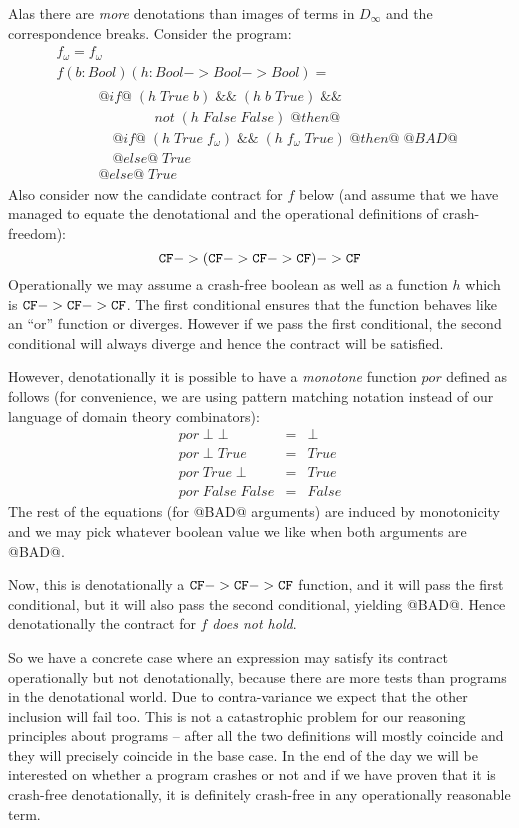 Alas there are {\em more} denotations than images of terms in $D_{\infty}$ and the correspondence breaks. Consider the program:
\[\begin{array}{lcl}
f_\omega = f_\omega \\
f (b{:}Bool) (h{:}Bool->Bool->Bool) = \\ 
\begin{array}{lll}
  &     & \quad @if@\;(h\;True\;b)\;\&\&\;(h\;b\;True)\;\&\& \\ 
  &     & \quad\qquad\qquad not\;(h\;False\;False)\;@then@ \\
  &     & \quad\quad @if@\;(h\;True\;f_\omega)\;\&\&\;(h\;f_\omega\;True)\;@then@\;@BAD@ \\
  &     & \quad\quad @else@\;True \\
  &     & \quad @else@\;True
\end{array}
\end{array}\]
Also consider now the candidate contract for $f$ below (and assume that we have managed to equate the denotational and the operational definitions of crash-freedom):
\[ {\tt CF} -> ({\tt CF} -> {\tt CF} -> {\tt CF}) -> {\tt CF} \]
Operationally we may assume a crash-free boolean as well as a function $h$ which is 
${\tt CF} -> {\tt CF} -> {\tt CF}$. The first conditional ensures that the function behaves like an ``or'' function or 
diverges. However if we pass the first conditional, 
the second conditional will always diverge and hence the contract will be satisfied. 

However, denotationally it is possible to have a {\em monotone} function $por$ defined as follows (for convenience, 
we are using pattern matching notation instead of our language of domain theory combinators):
\[\begin{array}{lcl}
  por\;\bot\;\bot & = & \bot \\ 
  por\;\bot\;True & = & True \\
  por\;True\;\bot & = & True \\ 
  por\;False\;False & = & False
\end{array}\] 
The rest of the equations (for @BAD@ arguments) are induced by monotonicity and we may pick whatever boolean value 
we like when both arguments are @BAD@. 

Now, this is denotationally a ${\tt CF} -> {\tt CF} -> {\tt CF}$ function, and it will pass the first conditional, but it will
also pass the second conditional, yielding @BAD@. Hence denotationally the contract for $f$ {\em does not hold}.

So we have a concrete case where an expression may satisfy its
contract operationally but not denotationally, because there are more
tests than programs in the denotational world. Due to contra-variance
we expect that the other inclusion will fail too. This is not a catastrophic 
problem for our reasoning principles about programs -- after all the two 
definitions will mostly coincide and they will precisely coincide in the base case. 
In the end of the day we will be interested on whether a program crashes or not and 
if we have proven that it is crash-free denotationally, it is definitely crash-free in 
any operationally reasonable term. 


